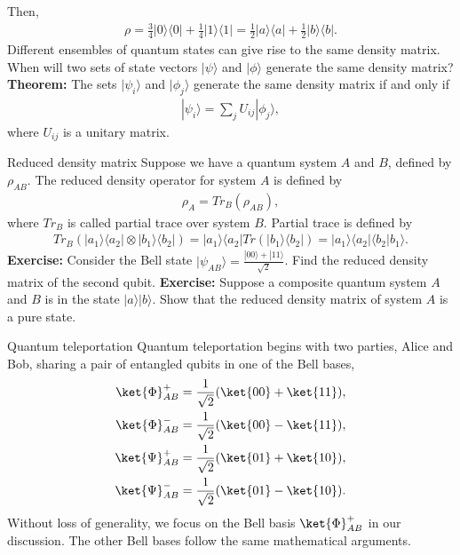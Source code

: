 \documentclass{beamer}
\begin{document}
\begin{frame}
\justify
Then,
\begin{align}
\rho = \frac{3}{4}|0\rangle \langle 0| + \frac{1}{4}|1\rangle \langle 1| = \frac{1}{2}|a\rangle \langle a| + \frac{1}{2}|b\rangle \langle b|.
\end{align}
\vfill
\textcolor[rgb]{1,0,0}{Different ensembles of quantum states can give rise to the same density matrix. When will two sets of state vectors $|\psi\rangle$ and $|\phi\rangle$ generate the same density matrix?}
\vfill
\textbf{\textcolor[rgb]{1,0,0}{Theorem:}} The sets $|\psi_i\rangle$ and $|\phi_j\rangle$ generate the same density matrix if and only if
\begin{align}
|\psi_i\rangle = \sum_j U_{ij} |\phi_j\rangle,
\end{align}
where $U_{ij}$ is a unitary matrix.
\end{frame}

\begin{frame}{Reduced density matrix}
\justify
Suppose we have a quantum system $A$ and $B$, defined by $\rho_{AB}$. The reduced density operator for system $A$ is defined by
\begin{align}
\rho_A = Tr_B(\rho_{AB}),
\end{align}
where $Tr_B$ is called partial trace over system $B$. Partial trace is defined by
\begin{align}
Tr_B (|a_1\rangle \langle a_2| \otimes |b_1\rangle \langle b_2|) = |a_1\rangle \langle a_2| Tr(|b_1\rangle \langle b_2|) = |a_1\rangle \langle a_2| \langle b_2 |b_1\rangle.
\end{align}
\vfill
\textbf{Exercise:} Consider the Bell state $|\psi_{AB}\rangle = \frac{|00\rangle + |11\rangle}{\sqrt{2}}$. Find the reduced density matrix of the second qubit.
\vfill
\textbf{Exercise:} Suppose a composite quantum system $A$ and $B$ is in the state $|a\rangle |b\rangle$. Show that the reduced density matrix of system $A$ is a pure state.
\end{frame}

\begin{frame}{Quantum teleportation}
\justify
Quantum teleportation begins with two parties, Alice and Bob, sharing a pair of entangled qubits in one of the Bell bases,
\begin{align}
\ket{\Phi}_{AB}^+ & = \frac{1}{\sqrt{2}} (\ket{00} + \ket{11}), \\
\ket{\Phi}_{AB}^- & = \frac{1}{\sqrt{2}} (\ket{00} - \ket{11}), \\
\ket{\Psi}_{AB}^+ & = \frac{1}{\sqrt{2}} (\ket{01} + \ket{10}), \\
\ket{\Psi}_{AB}^- & = \frac{1}{\sqrt{2}} (\ket{01} - \ket{10}).
\end{align}
Without loss of generality, we focus on the Bell basis $\ket{\Phi}_{AB}^+$ in our discussion. The other Bell bases follow the same mathematical arguments.
\end{frame}
\end{document}
